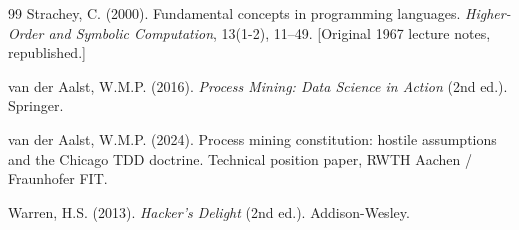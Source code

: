\documentclass[12pt,a4paper]{article}
\theoremstyle{definition}
\theoremstyle{remark}
\begin{document}
\begin{thebibliography}{99}
Strachey, C. (2000).
Fundamental concepts in programming languages.
\textit{Higher-Order and Symbolic Computation}, 13(1-2), 11--49.
[Original 1967 lecture notes, republished.]

van der Aalst, W.M.P. (2016).
\textit{Process Mining: Data Science in Action} (2nd ed.).
Springer.

van der Aalst, W.M.P. (2024).
Process mining constitution: hostile assumptions and the Chicago TDD doctrine.
Technical position paper, RWTH Aachen / Fraunhofer FIT.

Warren, H.S. (2013).
\textit{Hacker's Delight} (2nd ed.).
Addison-Wesley.

\end{thebibliography}
\end{document}
